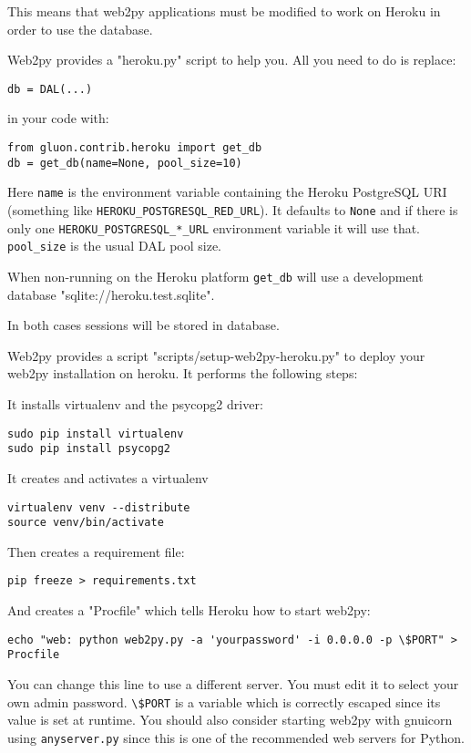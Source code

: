 \documentclass[justified,sixbynine,notoc]{tufte-book}
\def\ft{\small\tt}
\begin{document}
\begin{fullwidth}
This means that web2py applications must be modified to work on Heroku in order to use the database.

Web2py provides a "heroku.py" script to help you. All you need to do is replace:

\begin{lstlisting}
db = DAL(...)
\end{lstlisting}
\noindent in your code with:

\begin{lstlisting}
from gluon.contrib.heroku import get_db
db = get_db(name=None, pool_size=10)
\end{lstlisting}

Here {\ft name} is the environment variable containing the Heroku PostgreSQL URI (something like {\ft HEROKU\_POSTGRESQL\_RED\_URL}). It defaults to {\ft None} and if there is only one {\ft HEROKU\_POSTGRESQL\_*\_URL} environment variable it will use that. {\ft pool\_size} is the usual DAL pool size.

When non-running on the Heroku platform {\ft get\_db} will use a development database "sqlite://heroku.test.sqlite".

In both cases sessions will be stored in database.

Web2py provides a script "scripts/setup-web2py-heroku.py" to deploy your web2py installation on heroku. It performs the following steps:

It installs virtualenv and the psycopg2 driver:
\begin{lstlisting}
sudo pip install virtualenv
sudo pip install psycopg2
\end{lstlisting}

It creates and activates a virtualenv
\begin{lstlisting}
virtualenv venv --distribute
source venv/bin/activate
\end{lstlisting}

Then creates a requirement file:
\begin{lstlisting}
pip freeze > requirements.txt
\end{lstlisting}

And creates a "Procfile" which tells Heroku how to start web2py:

\begin{lstlisting}
echo "web: python web2py.py -a 'yourpassword' -i 0.0.0.0 -p \$PORT" > Procfile
\end{lstlisting}

You can change this line to use a different server. You must edit it to select your own admin password. {\ft {\textbackslash}\$PORT} is a variable which is correctly escaped since its value is set at runtime. You should also consider starting web2py with gnuicorn using {\ft anyserver.py} since this is one of the recommended web servers for Python.


\end{fullwidth}
\end{document}
